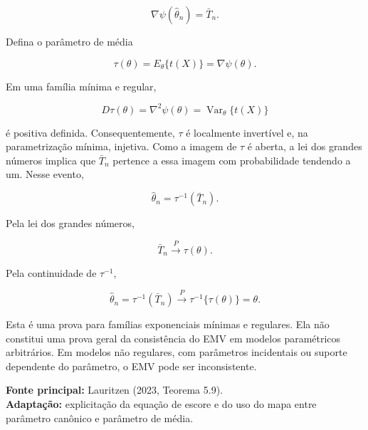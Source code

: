 \documentclass[
  letterpaper,
  DIV=11,
  numbers=noendperiod]{scrreprt}
\begin{document}
\[
\nabla\psi(\widehat\theta_n)=\bar T_n.
\]

Defina o parâmetro de média

\[
\tau(\theta)=E_\theta\{t(X)\}=\nabla\psi(\theta).
\]

Em uma família mínima e regular,

\[
D\tau(\theta)
=
\nabla^2\psi(\theta)
=
\operatorname{Var}_\theta\{t(X)\}
\]

é positiva definida. Consequentemente, \(\tau\) é localmente invertível
e, na parametrização mínima, injetiva. Como a imagem de \(\tau\) é
aberta, a lei dos grandes números implica que \(\bar T_n\) pertence a
essa imagem com probabilidade tendendo a um. Nesse evento,

\[
\widehat\theta_n=\tau^{-1}(\bar T_n).
\]

Pela lei dos grandes números,

\[
\bar T_n\xrightarrow{P}\tau(\theta).
\]

Pela continuidade de \(\tau^{-1}\),

\[
\widehat\theta_n
=
\tau^{-1}(\bar T_n)
\xrightarrow{P}
\tau^{-1}\{\tau(\theta)\}
=
\theta.
\]

\begin{tcolorbox}[enhanced jigsaw, colback=white, leftrule=.75mm, colbacktitle=quarto-callout-warning-color!10!white, breakable, titlerule=0mm, bottomtitle=1mm, title=\textcolor{quarto-callout-warning-color}{\faExclamationTriangle}\hspace{0.5em}{Escopo do resultado}, colframe=quarto-callout-warning-color-frame, toprule=.15mm, opacityback=0, bottomrule=.15mm, opacitybacktitle=0.6, arc=.35mm, toptitle=1mm, rightrule=.15mm, coltitle=black, left=2mm]

Esta é uma prova para famílias exponenciais mínimas e regulares. Ela não
constitui uma prova geral da consistência do EMV em modelos paramétricos
arbitrários. Em modelos não regulares, com parâmetros incidentais ou
suporte dependente do parâmetro, o EMV pode ser inconsistente.

\end{tcolorbox}

\begin{tcolorbox}[enhanced jigsaw, colback=white, leftrule=.75mm, colbacktitle=quarto-callout-note-color!10!white, breakable, titlerule=0mm, bottomtitle=1mm, title=\textcolor{quarto-callout-note-color}{\faInfo}\hspace{0.5em}{Fonte da demonstração}, colframe=quarto-callout-note-color-frame, toprule=.15mm, opacityback=0, bottomrule=.15mm, opacitybacktitle=0.6, arc=.35mm, toptitle=1mm, rightrule=.15mm, coltitle=black, left=2mm]

\textbf{Fonte principal:} Lauritzen (2023, Teorema 5.9).\\
\textbf{Adaptação:} explicitação da equação de escore e do uso do mapa
entre parâmetro canônico e parâmetro de média.

\end{tcolorbox}
\end{document}
